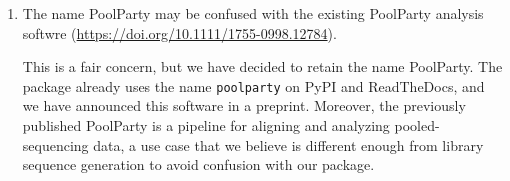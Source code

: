 \documentclass[11pt]{article}
\newenvironment{response}{\par\color{responseblue}}{\par}
\newenvironment{msquote}
  {\begin{quote}\color{responseblue}\itshape\noindent\ignorespaces}
  {\end{quote}}
\begin{document}
\begin{enumerate}




\item The name PoolParty may be confused with the existing PoolParty analysis
softwre (\url{https://doi.org/10.1111/1755-0998.12784}).

\begin{response}
This is a fair concern, but we have decided to retain the name PoolParty. The package already uses the name \texttt{poolparty} on PyPI and ReadTheDocs, and we have announced this software in a preprint. Moreover, the previously published PoolParty is a pipeline for aligning and analyzing pooled-sequencing data, a use case that we believe is different enough from library sequence generation to avoid confusion with our package. 
\end{response}


\end{enumerate}
\end{document}
